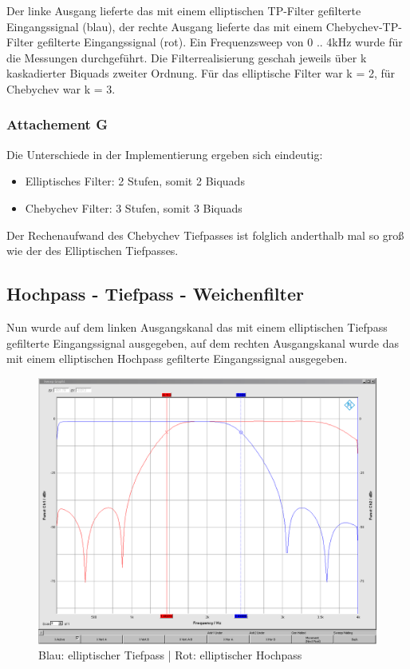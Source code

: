 \noindent Der linke Ausgang lieferte das mit einem elliptischen TP-Filter gefilterte Eingangssignal (blau), der rechte Ausgang lieferte das mit einem Chebychev-TP-Filter gefilterte Eingangssignal (rot). Ein Frequenzsweep von 0 .. 4kHz wurde für die Messungen durchgeführt. Die Filterrealisierung geschah jeweils über k kaskadierter Biquads zweiter Ordnung. Für das elliptische Filter war k = 2, für Chebychev war k = 3.

\subsubsection{Attachement G}
\noindent Die Unterschiede in der Implementierung ergeben sich eindeutig:
\begin{itemize}
	\item Elliptisches Filter: 2 Stufen, somit 2 Biquads
	\item Chebychev Filter: 3 Stufen, somit 3 Biquads
\end{itemize}
\noindent Der Rechenaufwand des Chebychev Tiefpasses ist folglich anderthalb mal so groß wie der des Elliptischen Tiefpasses.

\clearpage

\subsection{Hochpass - Tiefpass - Weichenfilter}
\noindent Nun wurde auf dem linken Ausgangskanal das mit einem elliptischen Tiefpass gefilterte Eingangssignal ausgegeben, auf dem rechten Ausgangskanal wurde das mit einem elliptischen Hochpass gefilterte Eingangssignal ausgegeben.

\begin{figure}[h]
	\centering
	\includegraphics[width=0.7\linewidth]{Bilder/EllipTPHP}
	\caption{Blau: elliptischer Tiefpass | Rot: elliptischer Hochpass}
	\label{fig:EllipTPHP}
\end{figure}

